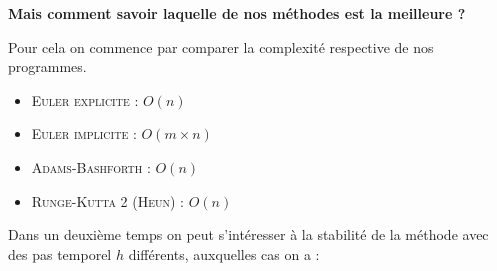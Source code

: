 \documentclass[12pt]{article}
\theoremstyle{saav}
\begin{document}
	\textbf{Mais comment savoir laquelle de nos méthodes est la meilleure ? }
	
	Pour cela on commence par comparer la complexité respective de nos programmes.
	\begin{itemize}[label*=\textbullet]
		\item \textsc{Euler explicite} : $O(n)$
		\item \textsc{Euler implicite} : $O(m\times n)$
		\item \textsc{Adams-Bashforth} : $O(n)$
		\item \textsc{Runge-Kutta 2 (Heun)} : $O(n)$
	\end{itemize} 
	
	Dans un deuxième temps on peut s'intéresser à la stabilité de la méthode avec des pas temporel $h$ différents, auxquelles cas on a :
	
\end{document}
